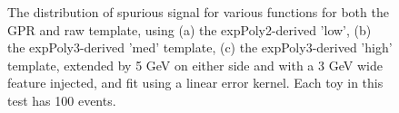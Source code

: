 \begin{figure} 
\begin{center}

\caption{The distribution of spurious signal for various functions for both the GPR and raw template, using (a) the expPoly2-derived 'low', (b) the expPoly3-derived 'med' template, (c) the expPoly3-derived 'high' template, extended by 5 GeV on either side and with a 3 GeV wide feature injected, and fit using a linear error kernel. Each toy in this test has 100 events.}
\label{fig:linearkernel_lowpt_100_Sig_1s}
\end{center}
\end{figure}


